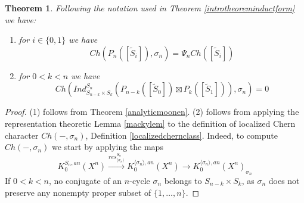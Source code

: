 \documentclass[11pt,leqno,twoside]{amsart}
\theoremstyle{plainsl}
\newtheorem{theorem}{Theorem}[section]
\theoremstyle{definition}
\begin{document}
\begin{theorem} \label{vanishingchind}  Following the notation used in Theorem \ref{introtheoreminductform} we have:
\begin{enumerate} 
\item for $i\in \{0,1\}$ we have
\[Ch( P_{n}([\tilde{S}_{i}]),\sigma_n)=\Psi_nCh([\tilde{S}_{i}])\]
    \item for $0<k<n$ we have
    \[Ch( Ind_{S_{n-k}\times S_k}^{S_n}(P_{n-k}([\tilde{S}_{0}])\boxtimes P_{k}([\tilde{S}_{1}])),\sigma_n)=0\]
    
\end{enumerate}
\end{theorem}
\begin{proof}
(1) follows from  Theorem \ref{analyticmoonen}. (2) follows from applying the representation theoretic Lemma \ref{mackylem} to the definition of localized Chern character $Ch(-,\sigma_n)$,  Definition \ref{localizedchernclass}. Indeed, to compute $Ch(-,\sigma_n)$ we start by applying the maps
\[K_0^{S_n,an}(X^n)\xrightarrow{res^{S_n}_{\langle \sigma_n \rangle}} K_0^{\langle \sigma_n \rangle,an}(X^n)\rightarrow K_0^{\langle \sigma_n \rangle,an}(X^n)_{{\sigma_n}}\]
If    $0<k<n$, no conjugate of an $n$-cycle $\sigma_n$ belongs to $S_{n-k}\times S_k$, as $\sigma_n$ does not preserve any nonempty proper subset of $\{1,\ldots,n\}$.
\end{proof}
\end{document}
